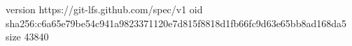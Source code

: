 version https://git-lfs.github.com/spec/v1
oid sha256:c6a65e79be54c941a9823371120e7d815f8818d1fb66fc9d63e65bb8ad168da5
size 43840
